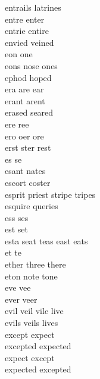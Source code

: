 entrails latrines\\
entre enter\\
entrie entire\\
envied veined\\
eon one\\
eons nose ones\\
ephod hoped\\
era are ear\\
erant arent\\
erased seared\\
ere ree\\
ero oer ore\\
erst ster rest\\
es se\\
esant nates\\
escort coster\\
esprit priest stripe tripes\\
esquire queries\\
ess ses\\
est set\\
esta seat teas east eats\\
et te\\
ether three there\\
eton note tone\\
eve vee\\
ever veer\\
evil veil vile live\\
evils veils lives\\
except expect\\
excepted expected\\
expect except\\
expected excepted\\

